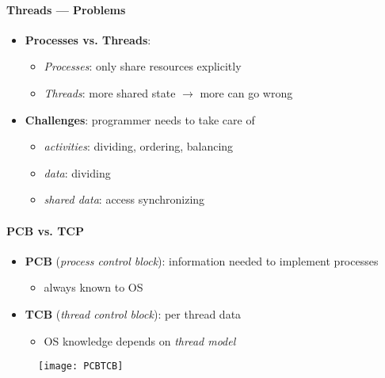 \paragraph{Threads --- Problems}
\begin{itemize}
  \item \textbf{Processes vs. Threads}:
  \begin{itemize}
    \item \emph{Processes}: only share resources explicitly
    \item \emph{Threads}: more shared state \( \to \) more can go wrong
  \end{itemize}
  \item \textbf{Challenges}: programmer needs to take care of
  \begin{itemize}
    \item \emph{activities}: dividing, ordering, balancing
    \item \emph{data}: dividing
    \item \emph{shared data}: access synchronizing
  \end{itemize}
\end{itemize}

\paragraph{PCB vs. TCP}
\begin{itemize}
  \item \textbf{PCB} (\emph{process control block}): information needed to implement processes
  \begin{itemize}
    \item always known to OS
  \end{itemize}
  \item \textbf{TCB} (\emph{thread control block}): per thread data
  \begin{itemize}
    \item OS knowledge depends on \emph{thread model}
  \end{itemize}
\end{itemize}
\begin{figure}[H]\centering\label{PCBTCB}\texttt{[image: PCBTCB]}\end{figure}

